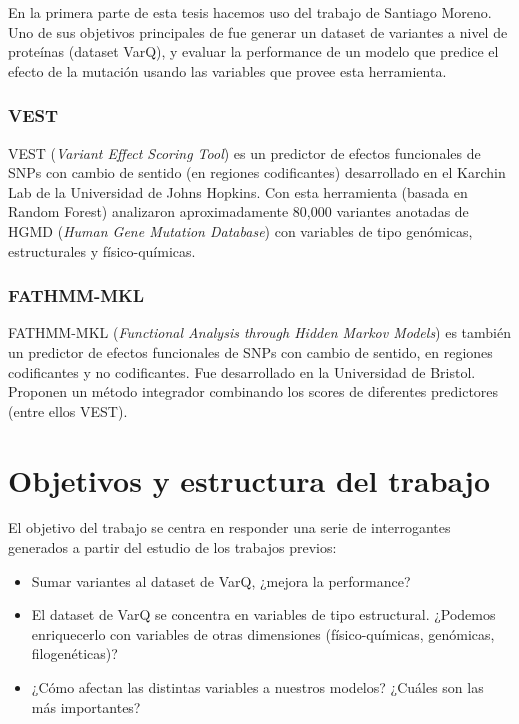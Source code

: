En la primera parte de esta tesis hacemos uso del trabajo de Santiago Moreno. Uno de sus objetivos principales de fue generar un dataset de variantes a nivel de proteínas (dataset VarQ), y evaluar la performance de un modelo que predice el efecto de la mutación usando las variables que provee esta herramienta. 

\subsubsection{VEST \cite{Carter2013}}

VEST (\textit{Variant Effect Scoring Tool}) es un predictor de efectos funcionales de SNPs con cambio de sentido (en regiones codificantes) desarrollado en el Karchin Lab de la Universidad de Johns Hopkins. Con esta herramienta (basada en Random Forest) analizaron aproximadamente 80,000 variantes anotadas de HGMD (\textit{Human Gene Mutation Database}) con variables de tipo genómicas, estructurales y físico-químicas.

\subsubsection{FATHMM-MKL \cite{Shihab2015}}

FATHMM-MKL (\textit{Functional Analysis through Hidden Markov Models}) es también un predictor de efectos funcionales de SNPs con cambio de sentido, en regiones codificantes y no codificantes. Fue desarrollado en la Universidad de Bristol. Proponen un método integrador combinando los scores de diferentes predictores (entre ellos VEST).

\newpage


\section{Objetivos y estructura del trabajo}

El objetivo del trabajo se centra en responder una serie de interrogantes generados a partir del estudio de los trabajos previos:

\begin{itemize}
    \item Sumar variantes al dataset de VarQ, ¿mejora la performance?
    \item El dataset de VarQ se concentra en variables de tipo estructural. ¿Podemos enriquecerlo con variables de otras dimensiones (físico-químicas, genómicas, filogenéticas)?
    \item ¿Cómo afectan las distintas variables a nuestros modelos? ¿Cuáles son las más importantes?
\end{itemize}

